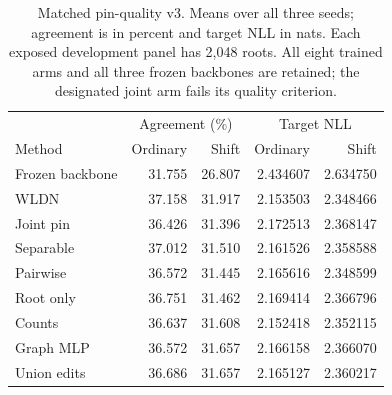 \begin{table}[ht]
\centering\small
\caption{Matched pin-quality v3. Means over all three seeds; agreement is
in percent and target NLL in nats. Each exposed development panel has
2,048 roots. All eight trained arms and all three frozen backbones are
retained; the designated joint arm fails its quality criterion.}
\label{tab:pin-quality-v3}
\begin{tabular}{lrrrr}
\toprule
& \multicolumn{2}{c}{Agreement (\%)} & \multicolumn{2}{c}{Target NLL} \\
Method & Ordinary & Shift & Ordinary & Shift \\
\midrule
Frozen backbone & 31.755 & 26.807 & 2.434607 & 2.634750 \\
WLDN & 37.158 & 31.917 & 2.153503 & 2.348466 \\
Joint pin & 36.426 & 31.396 & 2.172513 & 2.368147 \\
Separable & 37.012 & 31.510 & 2.161526 & 2.358588 \\
Pairwise & 36.572 & 31.445 & 2.165616 & 2.348599 \\
Root only & 36.751 & 31.462 & 2.169414 & 2.366796 \\
Counts & 36.637 & 31.608 & 2.152418 & 2.352115 \\
Graph MLP & 36.572 & 31.657 & 2.166158 & 2.366070 \\
Union edits & 36.686 & 31.657 & 2.165127 & 2.360217 \\
\bottomrule
\end{tabular}
\end{table}

